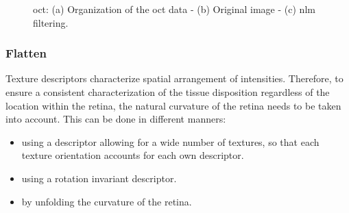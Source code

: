 \begin{figure}[t]
  \centering
  \hspace*{\fill}
   \hfill
   \hfill
  \hspace*{\fill}
  \caption{\ac{oct}: (a) Organization of the \ac{oct} data - (b) Original image - (c) \ac{nlm} filtering.}
  \label{fig:denoise}
\end{figure}

\subsubsection{Flatten}

Texture descriptors characterize spatial arrangement of intensities.
Therefore, to ensure a consistent characterization of the tissue disposition regardless of the location within the retina, the natural curvature of the retina needs to be taken into account.
This can be done in different manners:
\begin{itemize}
    \item using a descriptor allowing for a wide number of textures, so that
      each texture orientation accounts for each own descriptor.
    \item using a rotation invariant descriptor.
    \item by unfolding the curvature of the retina.
\end{itemize}

